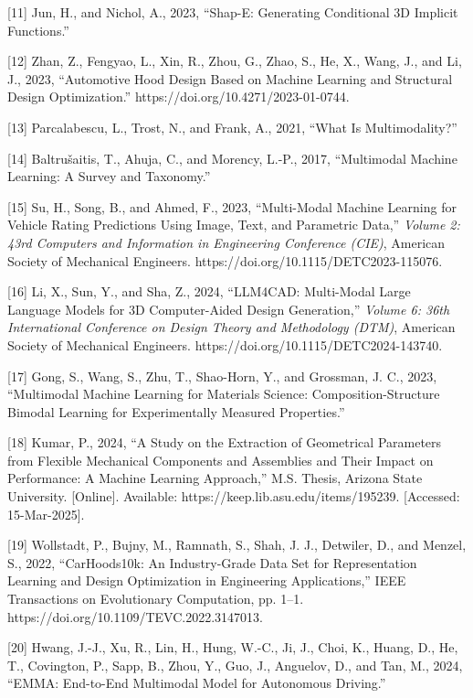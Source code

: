 \documentclass[11pt]{article}
\begin{document}
{[}11{]} Jun, H., and Nichol, A., 2023, ``Shap-E: Generating Conditional
3D Implicit Functions.''

{[}12{]} Zhan, Z., Fengyao, L., Xin, R., Zhou, G., Zhao, S., He, X.,
Wang, J., and Li, J., 2023, ``Automotive Hood Design Based on Machine
Learning and Structural Design Optimization.''
https://doi.org/10.4271/2023-01-0744.

{[}13{]} Parcalabescu, L., Trost, N., and Frank, A., 2021, ``What Is
Multimodality?''

{[}14{]} Baltrušaitis, T., Ahuja, C., and Morency, L.-P., 2017,
``Multimodal Machine Learning: A Survey and Taxonomy.''

{[}15{]} Su, H., Song, B., and Ahmed, F., 2023, ``Multi-Modal Machine
Learning for Vehicle Rating Predictions Using Image, Text, and
Parametric Data,'' \emph{Volume 2: 43rd Computers and Information in
Engineering Conference (CIE)}, American Society of Mechanical Engineers.
https://doi.org/10.1115/DETC2023-115076.

{[}16{]} Li, X., Sun, Y., and Sha, Z., 2024, ``LLM4CAD: Multi-Modal
Large Language Models for 3D Computer-Aided Design Generation,''
\emph{Volume 6: 36th International Conference on Design Theory and
Methodology (DTM)}, American Society of Mechanical Engineers.
https://doi.org/10.1115/DETC2024-143740.

{[}17{]} Gong, S., Wang, S., Zhu, T., Shao-Horn, Y., and Grossman, J.
C., 2023, ``Multimodal Machine Learning for Materials Science:
Composition-Structure Bimodal Learning for Experimentally Measured
Properties.''

{[}18{]} Kumar, P., 2024, ``A Study on the Extraction of Geometrical
Parameters from Flexible Mechanical Components and Assemblies and Their
Impact on Performance: A Machine Learning Approach,'' M.S. Thesis,
Arizona State University. {[}Online{]}. Available:
https://keep.lib.asu.edu/items/195239. {[}Accessed: 15-Mar-2025{]}.

{[}19{]} Wollstadt, P., Bujny, M., Ramnath, S., Shah, J. J., Detwiler,
D., and Menzel, S., 2022, ``CarHoods10k: An Industry-Grade Data Set for
Representation Learning and Design Optimization in Engineering
Applications,'' IEEE Transactions on Evolutionary Computation, pp. 1--1.
https://doi.org/10.1109/TEVC.2022.3147013.

{[}20{]} Hwang, J.-J., Xu, R., Lin, H., Hung, W.-C., Ji, J., Choi, K.,
Huang, D., He, T., Covington, P., Sapp, B., Zhou, Y., Guo, J., Anguelov,
D., and Tan, M., 2024, ``EMMA: End-to-End Multimodal Model for
Autonomous Driving.''
\end{document}
